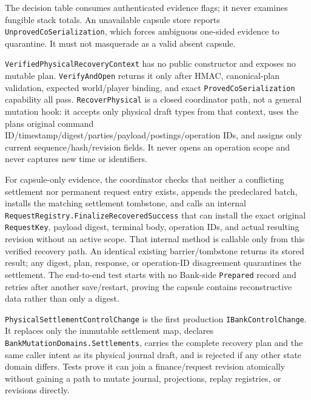 \documentclass[
  10pt,
  letterpaper,
]{article}
\newcommand{\passthrough}[1]{#1}
\begin{document}
The decision table consumes authenticated evidence flags; it never
examines fungible stack totals. An unavailable capsule store reports
\passthrough{\lstinline!UnprovedCoSerialization!}, which forces
ambiguous one-sided evidence to quarantine. It must not masquerade as a
valid absent capsule.

\texttt{VerifiedPhysicalRecoveryContext} has no public constructor and
exposes no mutable plan. \passthrough{\lstinline!VerifyAndOpen!} returns
it only after HMAC, canonical-plan validation, expected world/player
binding, and exact \passthrough{\lstinline!ProvedCoSerialization!}
capability all pass. \passthrough{\lstinline!RecoverPhysical!} is a
closed coordinator path, not a general mutation hook: it accepts only
physical draft types from that context, uses the plan\textquotesingle s
original command
ID/\allowbreak{}timestamp/\allowbreak{}digest/\allowbreak{}parties/\allowbreak{}payload/\allowbreak{}postings/\allowbreak{}operation
IDs, and assigns only current
sequence/\allowbreak{}hash/\allowbreak{}revision fields. It never opens
an operation scope and never captures new time or identifiers.

For capsule-only evidence, the coordinator checks that neither a
conflicting settlement nor permanent request entry exists, appends the
predeclared batch, installs the matching settlement tombstone, and calls
an internal
\texttt{RequestRegistry.}\allowbreak{}\texttt{FinalizeRecoveredSuccess}
that can install the exact original
\passthrough{\lstinline!RequestKey!}, payload digest, terminal body,
operation IDs, and actual resulting revision without an active scope.
That internal method is callable only from this verified recovery path.
An identical existing barrier/tombstone returns its stored result; any
digest, plan, response, or operation-ID disagreement quarantines the
settlement. The end-to-end test starts with no Bank-side
\passthrough{\lstinline!Prepared!} record and retries after another
save/restart, proving the capsule contains reconstructive data rather
than only a digest.

\texttt{PhysicalSettlementControlChange} is the first production
\passthrough{\lstinline!IBankControlChange!}. It replaces only the
immutable settlement map, declares
\texttt{BankMutationDomains.}\allowbreak{}\texttt{Settlements}, carries
the complete recovery plan and the same caller intent as its physical
journal draft, and is rejected if any other state domain differs. Tests
prove it can join a finance/request revision atomically without gaining
a path to mutate journal, projections, replay registries, or revisions
directly.
\end{document}
